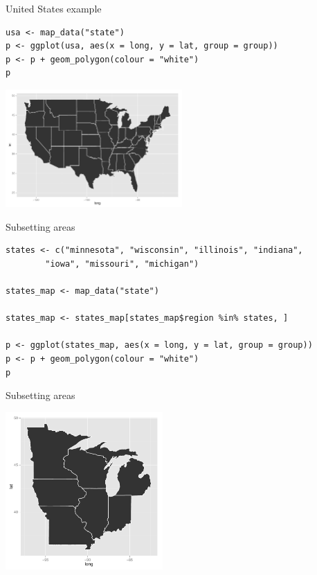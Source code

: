 \documentclass[sans,aspectratio=169,presentation,bigger,fleqn]{beamer}
\begin{document}
\begin{frame}[fragile,label=sec-12]{United States example}
 \scriptsize
\begin{verbatim}
usa <- map_data("state")
p <- ggplot(usa, aes(x = long, y = lat, group = group))
p <- p + geom_polygon(colour = "white")
p
\end{verbatim}

\begin{center}
\includegraphics[height=4.5cm]{./img/usa.pdf}
\end{center}

\normalsize
\end{frame}
\begin{frame}[fragile,label=sec-13]{Subsetting areas}
 \scriptsize
\begin{verbatim}
states <- c("minnesota", "wisconsin", "illinois", "indiana",
	    "iowa", "missouri", "michigan")

states_map <- map_data("state")

states_map <- states_map[states_map$region %in% states, ]

p <- ggplot(states_map, aes(x = long, y = lat, group = group))
p <- p + geom_polygon(colour = "white")
p
\end{verbatim}
\end{frame}
\begin{frame}[label=sec-14]{Subsetting areas}
\begin{center}
\includegraphics[height=6cm]{./img/some-states.pdf}
\end{center}
\end{frame}
\end{document}
